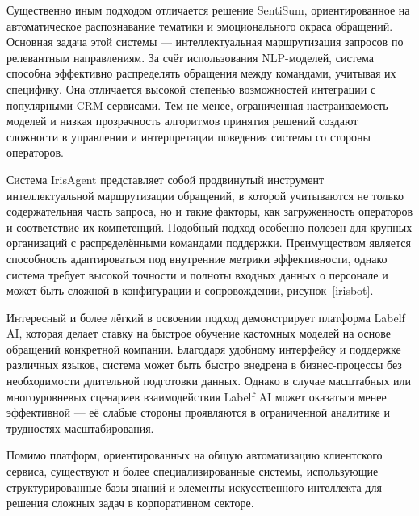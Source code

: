 Существенно иным подходом отличается решение SentiSum\cite{SentiSum}, ориентированное на автоматическое распознавание тематики и эмоционального окраса обращений. Основная задача этой системы — интеллектуальная маршрутизация запросов по релевантным направлениям. За счёт использования NLP-моделей, система способна эффективно распределять обращения между командами, учитывая их специфику. Она отличается высокой степенью возможностей интеграции с популярными CRM-сервисами. Тем не менее, ограниченная настраиваемость моделей и низкая прозрачность алгоритмов принятия решений создают сложности в управлении и интерпретации поведения системы со стороны операторов.


Система IrisAgent представляет собой продвинутый инструмент интеллектуальной маршрутизации обращений, в которой учитываются не только содержательная часть запроса, но и такие факторы, как загруженность операторов и соответствие их компетенций. Подобный подход особенно полезен для крупных организаций с распределёнными командами поддержки. Преимуществом является способность адаптироваться под внутренние метрики эффективности, однако система требует высокой точности и полноты входных данных о персонале и может быть сложной в конфигурации и сопровождении, рисунок~\ref{irisbot}.

Интересный и более лёгкий в освоении подход демонстрирует платформа Labelf AI\cite{Labelf}, которая делает ставку на быстрое обучение кастомных моделей на основе обращений конкретной компании. Благодаря удобному интерфейсу и поддержке различных языков, система может быть быстро внедрена в бизнес-процессы без необходимости длительной подготовки данных. Однако в случае масштабных или многоуровневых сценариев взаимодействия Labelf AI может оказаться менее эффективной — её слабые стороны проявляются в ограниченной аналитике и трудностях масштабирования.

Помимо платформ, ориентированных на общую автоматизацию клиентского сервиса, существуют и более специализированные системы, использующие структурированные базы знаний и элементы искусственного интеллекта для решения сложных задач в корпоративном секторе.

